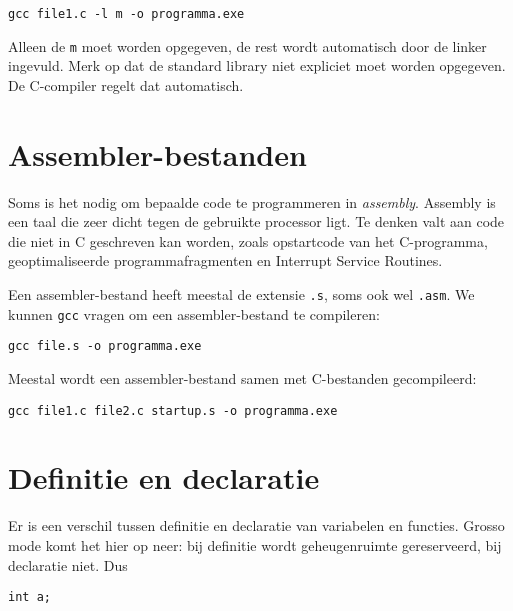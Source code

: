 \begin{lstlisting}[style=lstoneline]
gcc file1.c -l m -o programma.exe
\end{lstlisting}

Alleen de \texttt{m} moet worden opgegeven, de rest wordt automatisch door de linker ingevuld. Merk op dat de standard library niet expliciet moet worden opgegeven. De C-compiler regelt dat automatisch.


\section{Assembler-bestanden}
Soms is het nodig om bepaalde code te programmeren in \textit{assembly}. Assembly is een taal die zeer dicht tegen de gebruikte processor ligt. Te denken valt aan code die niet in C geschreven kan worden, zoals opstartcode van het C-programma, geoptimaliseerde programmafragmenten en Interrupt Service Routines.

Een assembler-bestand heeft meestal de extensie \texttt{.s}, soms ook wel \texttt{.asm}. We kunnen \texttt{gcc} vragen om een assembler-bestand te compileren:

\begin{lstlisting}[style=lstoneline]
gcc file.s -o programma.exe
\end{lstlisting}

Meestal wordt een assembler-bestand samen met C-bestanden gecompileerd:

\begin{lstlisting}[style=lstoneline]
gcc file1.c file2.c startup.s -o programma.exe
\end{lstlisting}


\section{Definitie en declaratie}
Er is een verschil tussen definitie en declaratie van variabelen en functies. Grosso mode komt het hier op neer: bij definitie wordt geheugenruimte gereserveerd, bij declaratie niet. Dus

\begin{lstlisting}[style=lstoneline]
int a;
\end{lstlisting}

